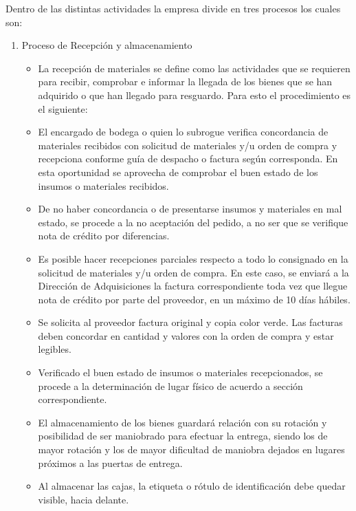 Dentro de las distintas actividades la empresa divide en tres procesos los cuales son:
\begin{enumerate}[1)]



\item Proceso de Recepción y almacenamiento
\begin{itemize}
\item  La recepción de materiales se define como las actividades que se requieren para recibir, comprobar e informar la llegada de los bienes que se han adquirido o que han llegado para resguardo. Para esto el procedimiento es el siguiente: 

\item El encargado de bodega o quien lo subrogue verifica concordancia de materiales recibidos con solicitud de materiales y/u orden de compra y recepciona conforme guía de despacho o factura  según corresponda. En esta oportunidad se aprovecha de comprobar el buen estado de los insumos o materiales recibidos. 
\item De no haber concordancia o de presentarse insumos y materiales en mal estado, se procede a la no aceptación del pedido, a no ser que se verifique nota de crédito por diferencias. 
\item Es posible hacer recepciones parciales respecto a todo lo consignado en la solicitud de materiales y/u orden de compra. En este caso, se enviará a la Dirección de Adquisiciones la factura correspondiente toda vez que llegue nota de crédito por parte del proveedor, en un máximo de 10 días hábiles. 
\item Se solicita al proveedor factura original y copia color verde. Las facturas deben concordar en cantidad y valores con la orden de compra y estar legibles.
\item Verificado el buen estado de insumos o materiales recepcionados, se procede a la determinación de lugar físico de acuerdo a sección correspondiente. 
\item El almacenamiento de los bienes guardará relación con su rotación y posibilidad de ser maniobrado para efectuar la entrega, siendo los de mayor rotación y los de mayor dificultad de maniobra dejados en lugares próximos a las puertas de entrega.
\item Al almacenar las cajas, la etiqueta o rótulo de identificación debe quedar visible, hacia delante.  
\end{itemize}
  

\end{enumerate}

